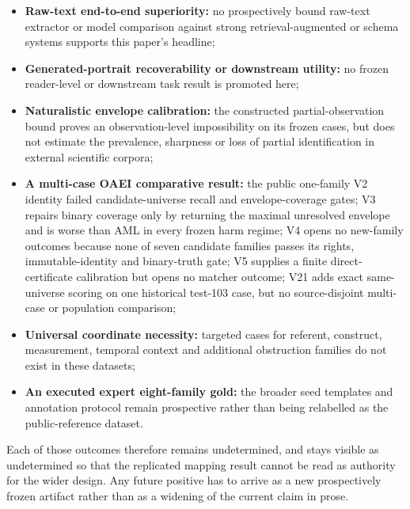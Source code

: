 \begin{itemize}
  \item \textbf{Raw-text end-to-end superiority:} no prospectively bound
        raw-text extractor or model comparison against strong
        retrieval-augmented or schema systems supports this paper's headline;
  \item \textbf{Generated-portrait recoverability or downstream utility:} no
        frozen reader-level or downstream task result is promoted here;
  \item \textbf{Naturalistic envelope calibration:} the constructed
        partial-observation bound proves an observation-level impossibility
        on its frozen cases, but does not estimate the prevalence, sharpness or
        loss of partial identification in external scientific corpora;
  \item \textbf{A multi-case OAEI comparative result:} the public one-family V2
        identity failed candidate-universe recall and envelope-coverage gates;
        V3 repairs binary coverage only by returning the maximal unresolved
        envelope and is worse than AML in every frozen harm regime; V4 opens no
        new-family outcomes because none of seven candidate families passes its
        rights, immutable-identity and binary-truth gate; V5 supplies a finite
        direct-certificate calibration but opens no matcher outcome; V21 adds
        exact same-universe scoring on one historical test-103 case, but no
        source-disjoint multi-case or population comparison;
  \item \textbf{Universal coordinate necessity:} targeted cases for referent,
        construct, measurement, temporal context and additional obstruction
        families do not exist in these datasets;
  \item \textbf{An executed expert eight-family gold:} the broader seed
        templates and annotation protocol remain prospective rather than being
        relabelled as the public-reference dataset.
\end{itemize}

Each of those outcomes therefore remains undetermined, and stays visible as
undetermined so that the replicated mapping result cannot be read as authority
for the wider design. Any future positive has to arrive as a new prospectively
frozen artifact rather than as a widening of the current claim in prose.

\endinput
